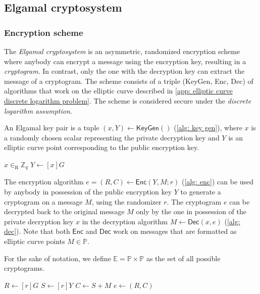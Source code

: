 \subsection{Elgamal cryptosystem} \label{app: elgamal cryptosystem}


\subsubsection{Encryption scheme} \label{app: encryption scheme}
The \textit{Elgamal cryptosystem} is an asymmetric, randomized encryption scheme where anybody can encrypt a message using the encryption key, resulting in a \textit{cryptogram}. In contrast, only the one with the decryption key can extract the message of a cryptogram. The scheme consists of a triple (\textsf{KeyGen}, \textsf{Enc}, \textsf{Dec}) of algorithms that work on the elliptic curve described in \cref{app: elliptic curve discrete logarithm problem}. The scheme is considered secure under the \textit{discrete logarithm assumption}.

An Elgamal key pair is a tuple $(x, Y) \gets \mathsf{KeyGen}()$ (\cref{alg: key gen}), where $x$ is a randomly chosen scalar representing the private decryption key and $Y$ is an elliptic curve point corresponding to the public encryption key.

\begin{algorithm}[ht]
    \DontPrintSemicolon
    \caption{$\mathsf{KeyGen}()$}
    \label{alg: key gen}
    
    $x \in_\mathrm{R} \mathbb{Z}_q$ \;
    $Y \gets [x]G$ \;
     
\end{algorithm}

The encryption algorithm $e = (R, C) \gets \mathsf{Enc} (Y, M; r)$ (\cref{alg: enc}) can be used by anybody in possession of the public encryption key $Y$ to generate a cryptogram on a message $M$, using the randomizer $r$. The cryptogram $e$ can be decrypted back to the original message $M$ only by the one in possession of the private decryption key $x$ in the decryption algorithm $M \gets \mathsf{Dec} (x, e)$ (\cref{alg: dec}). Note that both $\mathsf{Enc}$ and $\mathsf{Dec}$ work on messages that are formatted as elliptic curve points $M \in \mathbb{P}$.

For the sake of notation, we define $\mathbb{E} = \mathbb{P} \times \mathbb{P}$ as the set of all possible cryptograms.

\begin{algorithm}[ht]
    \DontPrintSemicolon
    \caption{$\mathsf{Enc} (Y, M; r)$}
    \label{alg: enc}
    
    $R \gets [r]G$ \;
    $S \gets [r]Y$ \;
    $C \gets S + M$ \;
    $e \gets (R, C)$ \;
     
\end{algorithm}

